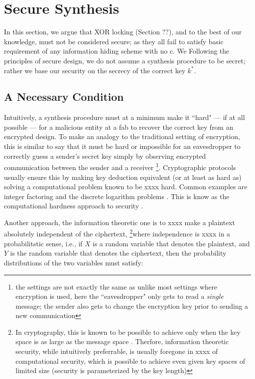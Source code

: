 \section{Secure Synthesis}
In this section, we argue that XOR locking (Section ??), and to the best of our knowledge, must not be considered secure; as they all fail to satisfy basic requirement of any information hiding scheme with no c. We Following the principles of secure design, we do not assume a synthesis procedure to be secret; rather we base our security on the secrecy of the correct key $k^*$.

\subsection{A Necessary Condition}
Intuitively, a synthesis procedure must at a minimum make it ``hard" --- if at all possible --- for a malicious entity at a fab to recover the correct key from an encrypted design. To make an analogy to the traditional setting of encryption, this is similar to say that it must be hard or impossible for an eavesdropper to correctly guess a sender's secret key simply by observing encrypted communication between the sender and a receiver \footnote{the settings are not exactly the same as unlike most settings where encryption is used, here the ``eavesdropper" only gets to read a \emph{single} message; the sender also gets to change the encryption key prior to sending a new communication}. Cryptographic protocols usually ensure this by making key deduction equivalent (or at least as hard as) solving a computational problem known to be xxxx hard. Common examples are integer factoring and the discrete logarithm problems \cite{}. This is know as the computational hardness approach to security \cite{}.

Another approach, the information theoretic one \cite{} is to xxxx make a plaintext absolutely independent of the ciphertext, \footnote{In cryptography, this is known to be possible to achieve only when the key space is as large as the message space \cite{}. Therfore, information theoretic security, while intuitively preferrable, is usually foregone in xxxx of computational security, which is possible to achieve even given key spaces of limited size (security is parameterized by the key length)}where independence is xxxx in a probabilitstic sense, i.e., if $X$ is a random variable that denotes the plaintext, and $Y$ is the random variable that denotes the ciphertext, then the probability distributions of the two variables must satisfy:

